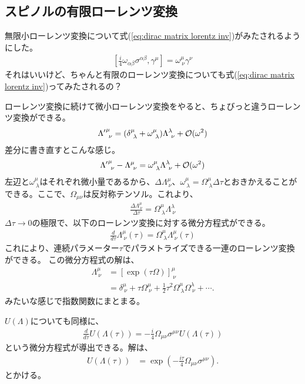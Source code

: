 \documentclass[10pt,a4paper]{jarticle}
\begin{document}
\subsection{スピノルの有限ローレンツ変換}
無限小ローレンツ変換について式(\ref{eq:dirac matrix lorentz inv})がみたされるようにした。
\begin{align}
\left[ \frac{i}{4}\omega_{\alpha\beta} \sigma^{\alpha\beta}, \gamma^\mu \right] = 
\omega^\mu_{~\nu} \gamma^\nu
\end{align}
それはいいけど、ちゃんと有限のローレンツ変換についても式(\ref{eq:dirac matrix lorentz inv})ってみたされるの？

ローレンツ変換に続けて微小ローレンツ変換をやると、ちょびっと違うローレンツ変換ができる。
\begin{align}
{\Lambda'}^\mu_{~\nu} = (\delta^\mu_{~\lambda} + \omega^\mu_{~\lambda} ) \Lambda^\lambda_{~\nu} + {\cal O}(\omega^2)
\end{align}
%
差分に書き直すとこんな感じ。
\begin{align}
{\Lambda'}^\mu_{~\nu} - {\Lambda}^\mu_{~\nu} = \omega^\mu_{~\lambda} \Lambda^\lambda_{~\nu} + {\cal O}(\omega^2)
\end{align}
左辺と$\omega^\mu_{~\lambda}$はそれぞれ微小量であるから、$\Delta \Lambda^\mu_{~\nu}$、$\omega^\mu_{~\lambda} = \Omega^\mu_{~\lambda} \Delta\tau$とおきかえることができる。ここで、$\Omega_{\mu\nu}$は反対称テンソル。これより、
\begin{align}
\frac{\Delta \Lambda^\mu_{~\nu}}{\Delta \tau} = \Omega^\mu_{~\lambda} \Lambda^\lambda_{~\nu}
\end{align}
$\Delta \tau \to 0$の極限で、以下のローレンツ変換に対する微分方程式ができる。
\begin{align}
\frac{d}{d\tau} {\Lambda}^\mu_{~\nu}(\tau) = \Omega^\mu_{~\lambda} {\Lambda}^\mu_{~\nu}(\tau)
\end{align}
これにより、連続パラメーター$\tau$でパラメトライズできる一連のローレンツ変換ができる。
この微分方程式の解は、
\begin{align}
\Lambda^\mu_{~\nu}
&= [\exp(\tau\Omega)]^\mu_{~\nu} \nonumber\\
&= \delta^\mu_{~\nu} + \tau \Omega^\mu_{~\nu} + \frac{1}{2} \tau^2 \Omega^\mu_{~\lambda}\Omega^\lambda_{~\nu} + \cdots.
\end{align}
みたいな感じで指数関数にまとまる。

$U(\Lambda)$についても同様に、
\begin{align}
\frac{d}{d\tau} U(\Lambda(\tau)) = -\frac{i}{4} \Omega_{\mu\nu} \sigma^{\mu\nu} U(\Lambda(\tau))
\end{align}
という微分方程式が導出できる。解は、
\begin{align}
U(\Lambda(\tau)) &= \exp\left( -\frac{i\tau}{4} \Omega_{\mu\nu} \sigma^{\mu\nu} \right).
\end{align}
とかける。
\end{document}
